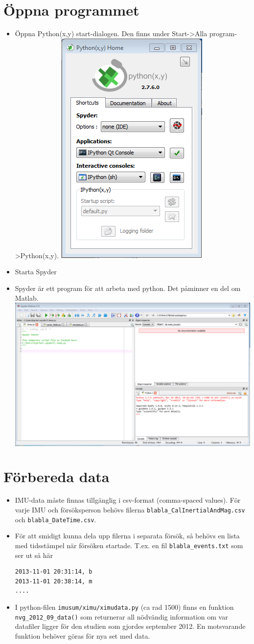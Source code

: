\documentclass[captions=tableheading]{scrartcl}
\begin{document}
\section{Öppna programmet}
\label{sec-3}
\begin{itemize}
\item Öppna Python(x,y) start-dialogen. Den finns under Start->Alla program->Python(x,y).
\includegraphics[width=0.3\linewidth]{xystartdialog}
\item Starta Spyder
\item Spyder är ett program för att arbeta med python. Det påminner en del om Matlab.
\includegraphics[width=\linewidth]{spyder}
\end{itemize}
\section{Förbereda data}
\label{sec-4}
\begin{itemize}
\item IMU-data måste finnas tillgänglig i csv-format (comma-spaced values). För varje IMU och försöksperson behövs filerna \verb~blabla_CalInertialAndMag.csv~ och \verb~blabla_DateTime.csv~.
\item För att smidigt kunna dela upp filerna i separata försök, så behövs en lista med tidsstämpel när försöken startade. T.ex. en fil \verb~blabla_events.txt~ som ser ut så här
\begin{verbatim}
2013-11-01 20:31:14, b
2013-11-01 20:38:14, m
....
\end{verbatim}
\item I python-filen \verb~imusum/ximu/ximudata.py~ (ca rad 1500) finns en funktion \texttt{nvg\_2012\_09\_data()} som returnerar all nödvändig information om var datafiler ligger för den studien som gjordes september 2012. En motsvarande funktion behöver göras för nya set med data.
\end{itemize}
\end{document}
